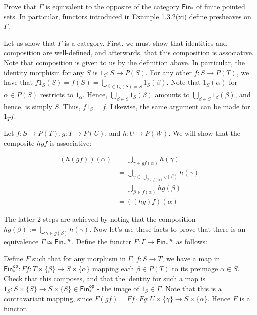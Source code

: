 \documentclass[10pt, oneside]{article}   	%
\newcommand{\cat}[1]{\bm{ \mathsf{#1} }}
\begin{document}
\begin{enumerate}[(i)]
Prove that $\Gamma$ is equivalent to the opposite of the category $\cat{Fin_*}$ of finite pointed sets. In particular, functors introduced in Example 1.3.2(xi) define presheaves on $\Gamma$.

Let us show that $\Gamma$ is a category. First, we must show that identities and composition are well-defined, and afterwards, that this composition is associative. Note that composition is given to us by the definition above. In particular, the identity morphism for any $S$ is $1_S : S \to P(S) $. For any other $f : S \to P(T)$, we have that $f1_S(S) = f(S) = \bigcup_{\beta \in 1_S(S) = S} 1_S(\beta)$. Note that $1_S(\alpha)$ for $\alpha \in P(S)$ restricts to $1_{\alpha}$. Hence, $\bigcup_{\beta \in S} 1_S(\beta)$ amounts to $\bigcup_{\beta \in S} 1_\beta(\beta)$, and hence, is simply $S$. Thus, $f1_S = f$, Likewise, the same argument can be made for $1_Tf$. 

Let $f : S \to P(T), g: T \to P(U)$, and $h: U \to P(W)$. We will show that the composite $hgf$ is associative: 

\begin{equation*}
	\begin{aligned}
		(h(gf))(\alpha) & = \bigcup_{\gamma \in gf(\alpha)} h(\gamma) \\
				      & = \bigcup_{\gamma \in \bigcup_{\beta \in f(\alpha)} g(\beta)} h(\gamma)\\
				      & = \bigcup_{\beta \in f(\alpha)} hg(\beta)  \\
				      &= ((hg)f)(\alpha)
	\end{aligned}
\end{equation*} 

The latter 2 steps are achieved by noting that the composition $hg(\beta) :=  \bigcup_{\gamma \in g(\beta)} h(\gamma)$. Now let's use these facts to prove that there is an equivalence $\Gamma  \simeq \cat{Fin_*}^{op}$. Define the functor $F : \Gamma \to \cat{Fin_*}^{op}$ as follows: 

Define $F$ such that for any morphism in $\Gamma$, $f : S \to T$, we have a map in $\cat{Fin_*^{op}}: Ff : T \times \{\beta\} \to S \times \{\alpha\}$ mapping each $\beta \in P(T)$ to its preimage $\alpha \in S$. Check that this composes, and that the identity for such a map is $1_S : S \times \{S\} \to S \times \{S\} \in \cat{Fin_*^{op}}$ - the image of $1_S \in \Gamma$. Note that this is a contravariant mapping, since $F(gf) = Ff \cdot Fg : U \times \{\gamma\} \to S \times \{\alpha\}$. Hence $F$ is a functor.


\end{enumerate}
\end{document}
